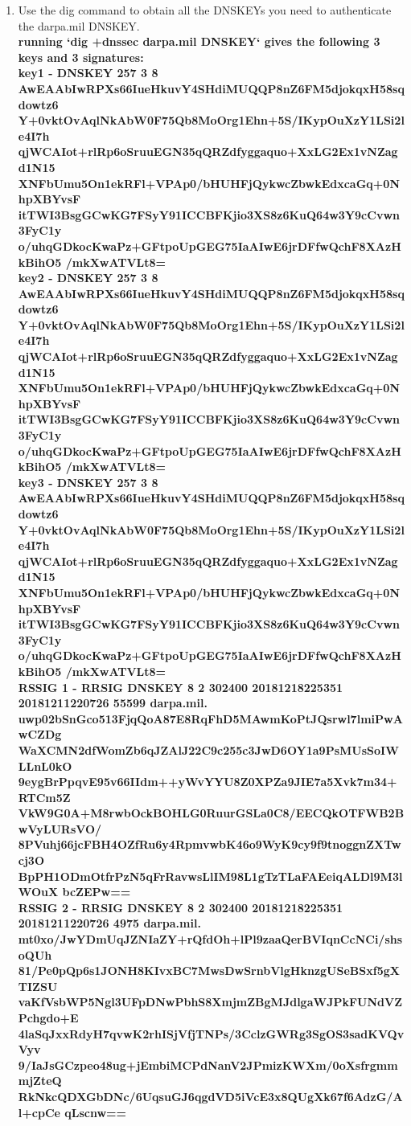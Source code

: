 \documentclass[12pt]{article}
\begin{document}
\begin{enumerate}
  \item Use the dig command to obtain all the DNSKEYs you need to authenticate the darpa.mil DNSKEY. \\

  \textbf{running `dig +dnssec darpa.mil DNSKEY` gives the following 3 keys and 3 signatures: } \\

  \textbf{key1 - DNSKEY	257 3 8 AwEAAbIwRPXs66IueHkuvY4SHdiMUQQP8nZ6FM5djokqxH58sqdowtz6 Y+0vktOvAqlNkAbW0F75Qb8MoOrg1Ehn+5S/IKypOuXzY1LSi2le4I7h qjWCAIot+rlRp6oSruuEGN35qQRZdfyggaquo+XxLG2Ex1vNZagd1N15 XNFbUmu5On1ekRFl+VPAp0/bHUHFjQykwcZbwkEdxcaGq+0NhpXBYvsF itTWI3BsgGCwKG7FSyY91ICCBFKjio3XS8z6KuQ64w3Y9cCvwn3FyC1y o/uhqGDkocKwaPz+GFtpoUpGEG75IaAIwE6jrDFfwQchF8XAzHkBihO5 /mkXwATVLt8=} \\

  \textbf{key2 - DNSKEY	257 3 8 AwEAAbIwRPXs66IueHkuvY4SHdiMUQQP8nZ6FM5djokqxH58sqdowtz6 Y+0vktOvAqlNkAbW0F75Qb8MoOrg1Ehn+5S/IKypOuXzY1LSi2le4I7h qjWCAIot+rlRp6oSruuEGN35qQRZdfyggaquo+XxLG2Ex1vNZagd1N15 XNFbUmu5On1ekRFl+VPAp0/bHUHFjQykwcZbwkEdxcaGq+0NhpXBYvsF itTWI3BsgGCwKG7FSyY91ICCBFKjio3XS8z6KuQ64w3Y9cCvwn3FyC1y o/uhqGDkocKwaPz+GFtpoUpGEG75IaAIwE6jrDFfwQchF8XAzHkBihO5 /mkXwATVLt8=} \\

  \textbf{key3 - DNSKEY	257 3 8 AwEAAbIwRPXs66IueHkuvY4SHdiMUQQP8nZ6FM5djokqxH58sqdowtz6 Y+0vktOvAqlNkAbW0F75Qb8MoOrg1Ehn+5S/IKypOuXzY1LSi2le4I7h qjWCAIot+rlRp6oSruuEGN35qQRZdfyggaquo+XxLG2Ex1vNZagd1N15 XNFbUmu5On1ekRFl+VPAp0/bHUHFjQykwcZbwkEdxcaGq+0NhpXBYvsF itTWI3BsgGCwKG7FSyY91ICCBFKjio3XS8z6KuQ64w3Y9cCvwn3FyC1y o/uhqGDkocKwaPz+GFtpoUpGEG75IaAIwE6jrDFfwQchF8XAzHkBihO5 /mkXwATVLt8=} \\

  \textbf{RSSIG 1 - RRSIG	DNSKEY 8 2 302400 20181218225351 20181211220726 55599 darpa.mil. uwp02bSnGco513FjqQoA87E8RqFhD5MAwmKoPtJQsrwl7lmiPwAwCZDg WaXCMN2dfWomZb6qJZAlJ22C9c255c3JwD6OY1a9PsMUsSoIWLLnL0kO 9eygBrPpqvE95v66IIdm++yWvYYU8Z0XPZa9JIE7a5Xvk7m34+RTCm5Z VkW9G0A+M8rwbOckBOHLG0RuurGSLa0C8/EECQkOTFWB2BwVyLURsVO/ 8PVuhj66jcFBH4OZfRu6y4RpmvwbK46o9WyK9cy9f9tnoggnZXTwcj3O BpPH1ODmOtfrPzN5qFrRavwsLlIM98L1gTzTLaFAEeiqALDl9M3lWOuX bcZEPw==} \\

  \textbf{RSSIG 2 - RRSIG	DNSKEY 8 2 302400 20181218225351 20181211220726 4975 darpa.mil. mt0xo/JwYDmUqJZNIaZY+rQfdOh+lPl9zaaQerBVIqnCcNCi/shsoQUh 81/Pe0pQp6s1JONH8KIvxBC7MwsDwSrnbVlgHknzgUSeBSxf5gXTIZSU vaKfVsbWP5Ngl3UFpDNwPbhS8XmjmZBgMJdlgaWJPkFUNdVZPchgdo+E 4laSqJxxRdyH7qvwK2rhISjVfjTNPs/3CclzGWRg3SgOS3sadKVQvVyv 9/IaJsGCzpeo48ug+jEmbiMCPdNanV2JPmizKWXm/0oXsfrgmmmjZteQ RkNkcQDXGbDNc/6UqsuGJ6qgdVD5iVcE3x8QUgXk67f6AdzG/Al+cpCe qLscnw==} \\


\end{enumerate}
\end{document}
